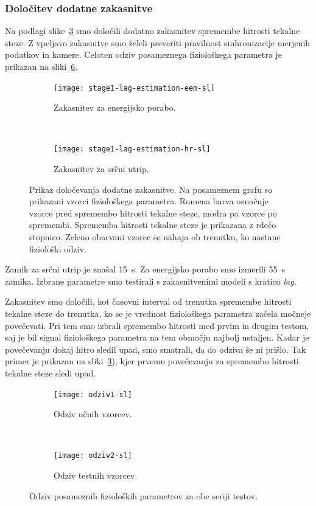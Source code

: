 \subsubsection{Določitev dodatne zakasnitve}
Na podlagi slike~\ref{fig:lag-estimation-stage1} smo določili dodatno zakasnitev spremembe hitrosti tekalne steze. Z vpeljavo zakasnitve smo želeli preveriti pravilnost sinhronizacije merjenih podatkov in kamere. Celoten odziv posameznega fiziološkega parametra je prikazan na sliki~\ref{fig:odziv-stage1}.


\begin{figure}[!htb]
	\centering
	\begin{subfigure}[t]{0.45\columnwidth}
		\texttt{[image: stage1-lag-estimation-eem-sl]}
		\caption{Zakasnitev za energijsko porabo.}
		\label{fig:lag-estimation-train-eem}
	\end{subfigure}
	~
	\begin{subfigure}[t]{0.45\columnwidth}
		\texttt{[image: stage1-lag-estimation-hr-sl]}
		\caption{Zakasnitev za srčni utrip.}
		\label{fig:lag-estimation-train-hr}
	\end{subfigure}
	\caption[Prikaz določevanja dodatne zakasnitve]{Prikaz določevanja dodatne zakasnitve. Na posameznem grafu so prikazani vzorci fiziološkega parametra. Rumena barva označuje vzorce pred spremembo hitrosti tekalne steze, modra pa vzorce po spremembi. Sprememba hitrosti tekalne steze je prikazana z rdečo stopnico. Zeleno obarvani vzorec se nahaja ob trenutku, ko nastane fiziološki odziv.}
	\label{fig:lag-estimation-stage1}
\end{figure}

Zamik za srčni utrip je znašal \SI{15}{\s}. Za energijsko porabo smo izmerili \SI{55}{\s} zamika. Izbrane parametre smo testirali s zakasnitvenimi modeli s kratico \textit{lag}.

Zakasnitev smo določili, kot časovni interval od trenutka spremembe hitrosti tekalne steze do trenutka, ko se je vrednost fiziološkega parametra začela močneje povečevati. Pri tem smo izbrali spremembo hitrosti med prvim in drugim testom, saj je bil signal fiziološkega parametra na tem območju najbolj ustaljen. Kadar je povečevanju dokaj hitro sledil upad, smo smatrali, da do odziva še ni prišlo. Tak primer je prikazan na sliki~\ref{fig:lag-estimation-stage1}), kjer prvemu povečevanju za spremembo hitrosti tekalne steze sledi upad. 


\begin{figure}[!htb]
	\centering
	\begin{subfigure}[t]{0.45\columnwidth}
		\texttt{[image: odziv1-sl]}
		\caption{Odziv učnih vzorcev.}
		\label{fig:odziv-ucnih-stage1}
	\end{subfigure}
	~
	\begin{subfigure}[t]{0.45\columnwidth}
		\texttt{[image: odziv2-sl]}
		\caption{Odziv testnih vzorcev.}
		\label{fig:odziv-testnih-stage1}
	\end{subfigure}
	\caption[Odziv posameznih fizioloških parametrov za obe seriji testov]{Odziv posameznih fizioloških parametrov za obe seriji testov.}
	\label{fig:odziv-stage1}
\end{figure} 


